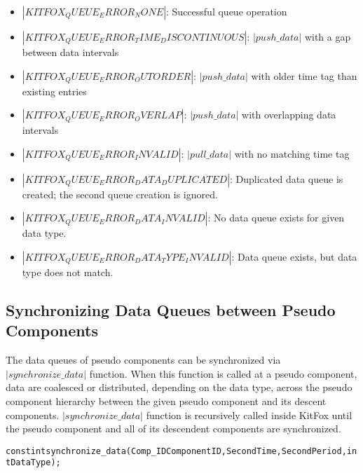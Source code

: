 \begin{itemize}
\item{$|KITFOX_QUEUE_ERROR_NONE|$: Successful queue operation} \vspace*{-5pt}\leavevmode
\item{$|KITFOX_QUEUE_ERROR_TIME_DISCONTINUOUS|$: $|push\_data|$ with a gap between data intervals} \vspace*{-5pt}\leavevmode
\item{$|KITFOX_QUEUE_ERROR_OUTORDER|$: $|push\_data|$ with older time tag than existing entries} \vspace*{-5pt}\leavevmode
\item{$|KITFOX_QUEUE_ERROR_OVERLAP|$: $|push\_data|$ with overlapping data intervals} \vspace*{-5pt}\leavevmode
\item{$|KITFOX_QUEUE_ERROR_INVALID|$: $|pull\_data|$ with no matching time tag} \vspace*{-5pt}\leavevmode
\item{$|KITFOX_QUEUE_ERROR_DATA_DUPLICATED|$: Duplicated data queue is created; the second queue creation is ignored.} \vspace*{-5pt}\leavevmode
\item{$|KITFOX_QUEUE_ERROR_DATA_INVALID|$: No data queue exists for given data type.} \vspace*{-5pt}\leavevmode
\item{$|KITFOX_QUEUE_ERROR_DATA_TYPE_INVALID|$: Data queue exists, but data type does not match.}
\end{itemize}

\subsection{Synchronizing Data Queues between Pseudo Components} \label{subsec:synchronizing_data_queues}
\noindent
The data queues of pseudo components can be synchronized via $|synchronize\_data|$ function. 
When this function is called at a pseudo component, data are coalesced or distributed, depending on the data type, across the pseudo component hierarchy between the given pseudo component and its descent components. 
$|synchronize\_data|$ function is recursively called inside KitFox until the pseudo component and all of its descendent components are synchronized.
{
\fontsize{10pt}{11pt}\selectfont
\begin{alltt}
const int synchronize_data(Comp_ID ComponentID, Second Time, Second Period, int DataType);
\end{alltt}
}

